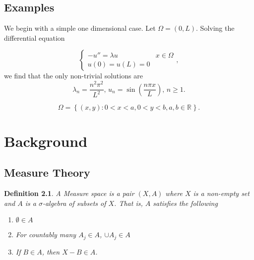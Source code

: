 \documentclass[12pt]{report}
\newtheorem{definition}{Definition}
\numberwithin{definition}{section}
\begin{document}





\break


\section{Examples}

We begin with a simple one dimensional case.
Let $\Omega = (0,L)$.
Solving the differential equation

\[
  \begin{cases}
    -u'' = \lambda u &  x \in \Omega \\
    u(0) = u(L) = 0 & 
  \end{cases}
,\] 
we find that the only non-trivial solutions are 
\[
  \lambda_{n} = \frac{n^2\pi^2}{L^2},\, u_{n} = \sin \left( \frac{n\pi x}{L} \right ),\, n \geq 1
.\] 


\[
\Omega = \left\{ (x,y) : 0 < x < a, 0 < y < b, a,b \in \mathbb{R}^{}  \right\}
.\] 




\chapter {Background}

\break


\section{Measure Theory}

\begin{definition}
  A Measure space is a pair $(X,A)$ where $X$ is a non-empty set and $A$ is a $\sigma$-algebra of subsets of $X$.
  That is, $A$ satisfies the following
  \begin{enumerate}
    \item $\emptyset \in A$
    \item For countably many $A_{j} \in A$, $\cup A_{j} \in A$ 
    \item If $B \in A$, then $X - B \in A$.
  \end{enumerate}
\end{definition}
\end{document}
